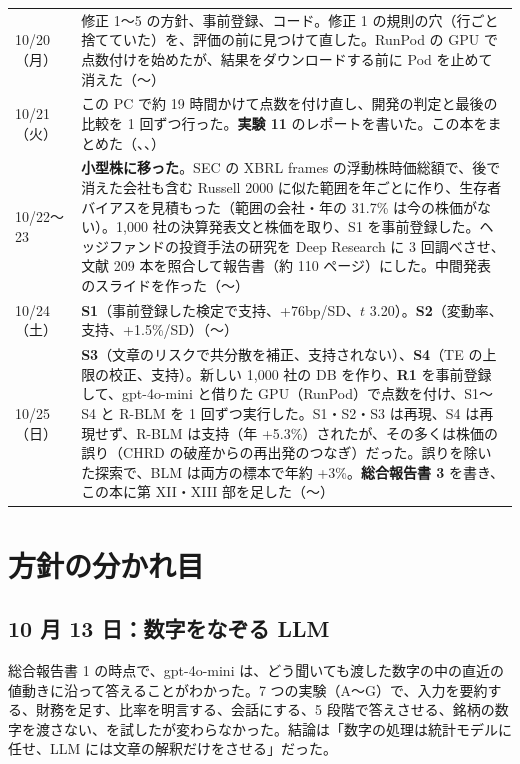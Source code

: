 \begin{longtable}{P{2.0cm}P{12.6cm}}
10/20（月） & 修正 1〜5 の方針、事前登録、コード。修正 1 の規則の穴（行ごと捨てていた）を、評価の前に見つけて直した。RunPod の GPU で点数付けを始めたが、結果をダウンロードする前に Pod を止めて消えた（〜） \\
10/21（火） & この PC で約 19 時間かけて点数を付け直し、開発の判定と最後の比較を 1 回ずつ行った。\textbf{実験 11} のレポートを書いた。この本をまとめた（、、） \\
10/22〜23 & \textbf{小型株に移った}。SEC の XBRL frames の浮動株時価総額で、後で消えた会社も含む Russell 2000 に似た範囲を年ごとに作り、生存者バイアスを見積もった（範囲の会社・年の 31.7\% は今の株価がない）。1,000 社の決算発表文と株価を取り、S1 を事前登録した。ヘッジファンドの投資手法の研究を Deep Research に 3 回調べさせ、文献 209 本を照合して報告書（約 110 ページ）にした。中間発表のスライドを作った（〜） \\
10/24（土） & \textbf{S1}（事前登録した検定で支持、+76bp/SD、$t$ 3.20）。\textbf{S2}（変動率、支持、+1.5\%/SD）（〜） \\
10/25（日） & \textbf{S3}（文章のリスクで共分散を補正、支持されない）、\textbf{S4}（TE の上限の校正、支持）。新しい 1,000 社の DB を作り、\textbf{R1} を事前登録して、gpt-4o-mini と借りた GPU（RunPod）で点数を付け、S1〜S4 と R-BLM を 1 回ずつ実行した。S1・S2・S3 は再現、S4 は再現せず、R-BLM は支持（年 +5.3\%）されたが、その多くは株価の誤り（CHRD の破産からの再出発のつなぎ）だった。誤りを除いた探索で、BLM は両方の標本で年約 +3\%。\textbf{総合報告書 3} を書き、この本に第 XII・XIII 部を足した（〜） \\
\end{longtable}

\section{方針の分かれ目}

\subsection{10 月 13 日：数字をなぞる LLM}

総合報告書 1 の時点で、gpt-4o-mini は、どう聞いても渡した数字の中の直近の値動きに沿って答えることがわかった。7 つの実験（A〜G）で、入力を要約する、財務を足す、比率を明言する、会話にする、5 段階で答えさせる、銘柄の数字を渡さない、を試したが変わらなかった。結論は「数字の処理は統計モデルに任せ、LLM には文章の解釈だけをさせる」だった。

